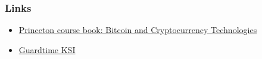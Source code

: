 \documentclass[8pt]{beamer}
\begin{document}
\begin{frame}
\frametitle{Links}
\begin{itemize}
 \item \href{https://d28rh4a8wq0iu5.cloudfront.net/bitcointech/readings/princeton\_bitcoin\_book.pdf?a=1}{Princeton course book: Bitcoin and Cryptocurrency Technologies}
 \item \href{https://guardtime.com/technology/ksi-technology}{Guardtime KSI}
\end{itemize}
\end{frame}
\end{document}
